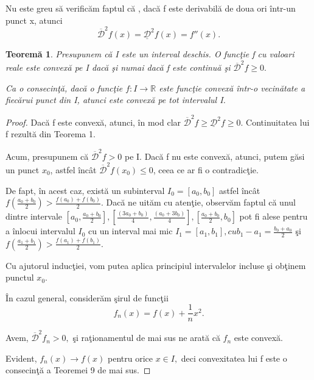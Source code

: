 \documentclass[a4paper,12pt,oneside]{report}
\newtheorem{theorem}{Teorem\u a}
\begin{document}
Nu este greu s\u{a} verific\u{a}m faptul c\u{a} , dac\u{a} f este derivabil\u{a} de doua ori \^{i}ntr-un punct x, atunci
\begin{displaymath}
   \overline{ \mathcal{D}}^{2}f\left ( x \right ) = \underline{\mathcal{D}}^{2}f\left ( x \right ) = {f}''\left ( x \right ). \label{eq:1.13} \tag{1.13}
\end{displaymath}
\begin{theorem}
Presupunem c\u{a} I este un interval deschis. O func\c{t}ie f cu valoari reale este convex\u{a} pe I dac\u{a} \c{s}i numai dac\u{a} f este continu\u{a} \c{s}i  \(\overline{ \mathcal{D}}^{2}f\geq 0.\)

  Ca o consecin\c{t}\u{a}, dac\u{a} o func\c{t}ie \(f : I \rightarrow \mathbb{R}\) este  func\c{t}ie convex\u{a}  \^{i}ntr-o vecin\u{a}tate a fiec\u{a}rui punct din I, atunci este convex\u{a} pe tot intervalul I.
\end{theorem}
\begin{proof}
Dac\u{a} f este convex\u{a}, atunci, \^{i}n mod clar \(\overline{ \mathcal{D}}^{2}f\geq \underline{\mathcal{D}}^{2}f\geq 0.\) Continuitatea lui f rezult\u{a} din Teorema 1.

Acum, presupunem c\u{a} \(\overline{ \mathcal{D}}^{2}f > 0\) pe I. Dac\u{a} f nu este convex\u{a}, atunci, putem g\u{a}si un punct \(x_{0}\), astfel \^{i}nc\^{a}t \(\overline{ \mathcal{D}}^{2}f \left ( x_{0} \right )\leq 0\), ceea ce ar fi o contradic\c{t}ie. 

De fapt, \^{i}n acest caz, exist\u{a} un subinterval \(I_{0} = \left [ a_{0}, b_{0} \right ]\) astfel \^{i}nc\^{a}t \(f\left ( \frac{a_{0} + b_{0}}{2} \right )> \frac{f\left ( a_{0} \right ) + f\left ( b_{0} \right )}{2}.\) Dac\u{a} ne uit\u{a}m cu aten\c{t}ie, observ\u{a}m faptul c\u{a} unul dintre intervale \(\left [ a_{0}, \frac{a_{0}+b_{0}}{2} \right ], \left [ \frac{\left ( 3a_{0}+b_{0} \right )}{4},\frac{\left ( a_{0}+3b_{0} \right )}{4} \right ],\left [\frac{a_{0}+b_{0}}{2}, b_{0} \right ]\) pot fi alese pentru a \^{i}nlocui intervalul \(I_{0}\) cu un interval mai mic \(I_{1}= \left [ a_{1}, b_{1} \right ], cu  b_{1} -  a_{1}= \frac{b_{0}+ a_{0}}{2}\) \c{s}i \(f\left ( \frac{a_{1}+b_{1}}{2} \right ) > \frac{f\left ( a_{1} \right ) + f\left ( b_{1} \right )}{2}.\) 

Cu ajutorul induc\c{t}iei, vom  putea aplica principiul intervalelor incluse \c{s}i ob\c{t}inem punctul \(x_{0}.\)

\^{I}n cazul general, consider\u{a}m \c{s}irul de func\c{t}ii
\begin{displaymath}
   f_{n}\left ( x \right ) = f\left ( x \right ) + \frac{1}{n}x^{2}.
\end{displaymath}

Avem, \(\overline{ \mathcal{D}}^{2}f _{n} > 0,\) \c{s}i ra\c{t}ionamentul de mai sus ne arat\u{a} c\u{a} \(f _{n}\) este convex\u{a}. 

Evident, \(f _{n}\left ( x \right ) \rightarrow f\left ( x \right )\) pentru orice \(x \in I,\) deci convexitatea lui f este o consecin\c{t}\u{a} a Teoremei 9 de mai sus.
\end{proof}
\end{document}
